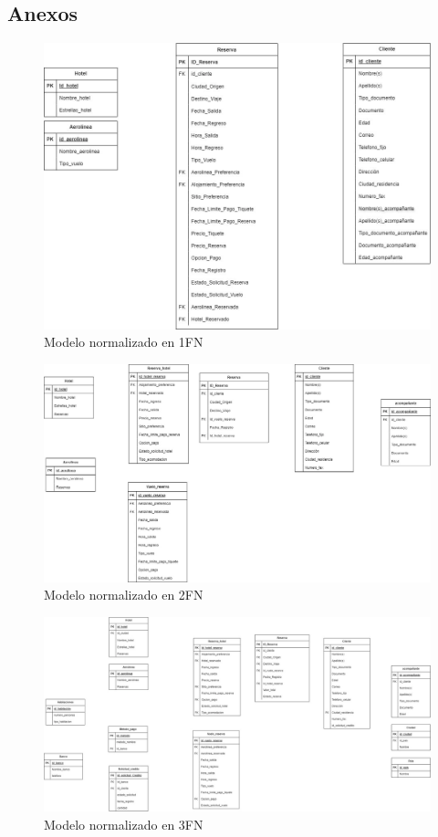 \documentclass{article}
\begin{document}
\newpage
\begin{landscape}
\section{Anexos}
\begin{figure}[H]
    \centering
    \includegraphics[scale=0.4]{img/FN1.png}
    \caption{Modelo normalizado en 1FN}
    \label{fig:NormalizacionFN1}
\end{figure}


\begin{figure}[H]
    \centering
    \includegraphics[width=0.9\linewidth]{img/FN2.png}
    \caption{Modelo normalizado en 2FN}
    \label{fig:Normalizacion2FN}
\end{figure}


\begin{figure}[H]
    \centering
    \includegraphics[width=1\linewidth]{img/FN3.png}
    \caption{Modelo normalizado en 3FN}
    \label{fig:Normalizacion3FN}
\end{figure}



\end{landscape}
\end{document}
